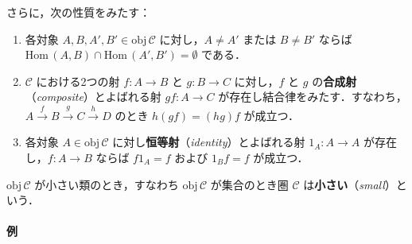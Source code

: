 \documentclass[10pt,b5paper,pandoc]{bxjsarticle}
\providecommand{\tightlist}{%
  \setlength{\itemsep}{0pt}\setlength{\parskip}{0pt}}
\let\oldparagraph\paragraph
\renewcommand{\paragraph}[1]{\oldparagraph{#1}\mbox{}}
\begin{document}
さらに，次の性質をみたす：

\begin{enumerate}
\def\labelenumi{\arabic{enumi})}
\tightlist
\item
  各対象 \(A, B, A', B' \in \mathrm{obj}\,\mathscr C\)
  に対し，\(A \neq A'\) または \(B \neq B'\) ならば
  \(\mathrm{Hom}\,(A, B) \cap \mathrm{Hom}\,(A', B') = \emptyset\)
  である．
\item
  \(\mathscr C\) における2つの射 \(f \colon A \to B\) と
  \(g \colon B \to C\) に対し，\(f\) と \(g\)
  の\textbf{合成射}（\emph{composite}）とよばれる射
  \(gf \colon A \to C\)
  が存在し結合律をみたす．すなわち，\(A \xrightarrow f B \xrightarrow g C \xrightarrow h D\)
  のとき \(h(gf) = (hg)f\) が成立つ．
\item
  各対象 \(A \in \mathrm{obj}\,\mathscr C\)
  に対し\textbf{恒等射}（\emph{identity}）とよばれる射
  \(1_A \colon A \to A\) が存在し，\(f \colon A \to B\) ならば
  \(f1_A = f\) および \(1_ B f = f\) が成立つ．
\end{enumerate}

\(\mathrm{obj}\,\mathscr C\) が小さい類のとき，すなわち
\(\mathrm{obj}\,\mathscr C\) が集合のとき圏 \(\mathscr C\)
は\textbf{小さい}（\emph{small}）という．

\hypertarget{ux4f8b}{%
\paragraph{例}\label{ux4f8b}}
\end{document}
